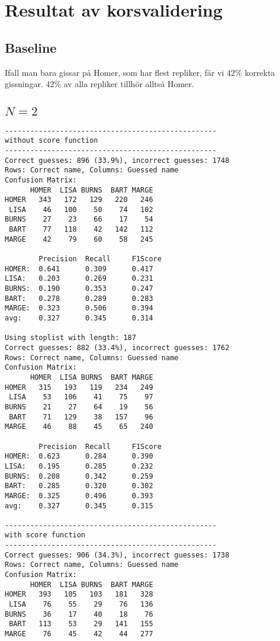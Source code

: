\documentclass[a4paper]{article}
\begin{document}
\section{Resultat av korsvalidering}

\subsection{Baseline}
Ifall man bara gissar på Homer, som har flest repliker, får vi 42\% korrekta
gissningar. 42\% av alla repliker tillhör alltså Homer.

\subsection{$N=2$}
\begin{verbatim}
--------------------------------------------------
without score function
--------------------------------------------------
Correct guesses: 896 (33.9%), incorrect guesses: 1748
Rows: Correct name, Columns: Guessed name
Confusion Matrix:
      HOMER  LISA BURNS  BART MARGE 
HOMER   343   172   129   220   246 
 LISA    46   100    50    74   102 
BURNS    27    23    66    17    54 
 BART    77   118    42   142   112 
MARGE    42    79    60    58   245 

        Precision  Recall     F1Score    
HOMER:  0.641      0.309      0.417      
LISA:   0.203      0.269      0.231      
BURNS:  0.190      0.353      0.247      
BART:   0.278      0.289      0.283      
MARGE:  0.323      0.506      0.394      
avg:    0.327      0.345      0.314      

Using stoplist with length: 187
Correct guesses: 882 (33.4%), incorrect guesses: 1762
Rows: Correct name, Columns: Guessed name
Confusion Matrix:
      HOMER  LISA BURNS  BART MARGE 
HOMER   315   193   119   234   249 
 LISA    53   106    41    75    97 
BURNS    21    27    64    19    56 
 BART    71   129    38   157    96 
MARGE    46    88    45    65   240 

        Precision  Recall     F1Score    
HOMER:  0.623      0.284      0.390      
LISA:   0.195      0.285      0.232      
BURNS:  0.208      0.342      0.259      
BART:   0.285      0.320      0.302      
MARGE:  0.325      0.496      0.393      
avg:    0.327      0.345      0.315      

--------------------------------------------------
with score function
--------------------------------------------------
Correct guesses: 906 (34.3%), incorrect guesses: 1738
Rows: Correct name, Columns: Guessed name
Confusion Matrix:
      HOMER  LISA BURNS  BART MARGE 
HOMER   393   105   103   181   328 
 LISA    76    55    29    76   136 
BURNS    36    17    40    18    76 
 BART   113    53    29   141   155 
MARGE    76    45    42    44   277 


\end{verbatim}
\end{document}
